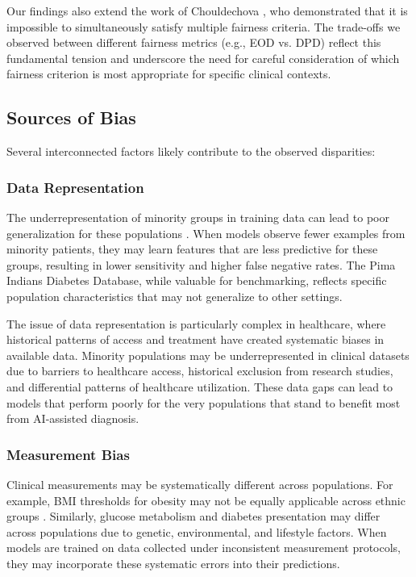 Our findings also extend the work of Chouldechova \cite{chouldechova2017}, 
who demonstrated that it is impossible to simultaneously satisfy multiple 
fairness criteria. The trade-offs we observed between different fairness 
metrics (e.g., EOD vs. DPD) reflect this fundamental tension and underscore 
the need for careful consideration of which fairness criterion is most 
appropriate for specific clinical contexts.

\subsection{Sources of Bias}

Several interconnected factors likely contribute to the observed disparities:

\subsubsection{Data Representation}

The underrepresentation of minority groups in training data can lead to 
poor generalization for these populations \cite{mehrabi2021}. When models 
observe fewer examples from minority patients, they may learn features that 
are less predictive for these groups, resulting in lower sensitivity and 
higher false negative rates. The Pima Indians Diabetes Database, while 
valuable for benchmarking, reflects specific population characteristics 
that may not generalize to other settings.

The issue of data representation is particularly complex in healthcare, 
where historical patterns of access and treatment have created systematic 
biases in available data. Minority populations may be underrepresented 
in clinical datasets due to barriers to healthcare access, historical 
exclusion from research studies, and differential patterns of healthcare 
utilization. These data gaps can lead to models that perform poorly for 
the very populations that stand to benefit most from AI-assisted diagnosis.

\subsubsection{Measurement Bias}

Clinical measurements may be systematically different across populations. 
For example, BMI thresholds for obesity may not be equally applicable across 
ethnic groups \cite{who2000}. Similarly, glucose metabolism and diabetes 
presentation may differ across populations due to genetic, environmental, 
and lifestyle factors. When models are trained on data collected under 
inconsistent measurement protocols, they may incorporate these systematic 
errors into their predictions.

